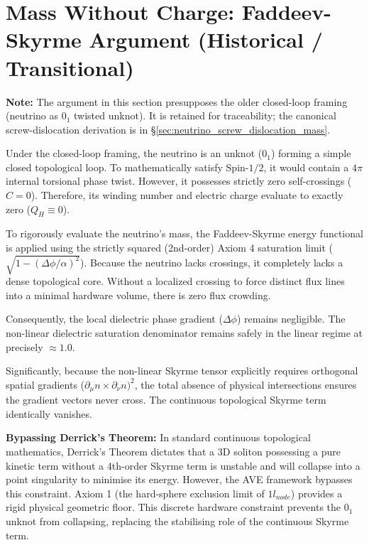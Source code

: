 \section{Mass Without Charge: Faddeev-Skyrme Argument (Historical / Transitional)}

\noindent\textbf{Note:} The argument in this section presupposes the older closed-loop framing (neutrino as $0_1$ twisted unknot). It is retained for traceability; the canonical screw-dislocation derivation is in \S\ref{sec:neutrino_screw_dislocation_mass}.

Under the closed-loop framing, the neutrino is an unknot ($0_{1}$) forming a simple closed topological loop. To
mathematically satisfy Spin-$1/2$, it would contain a $4\pi$ internal torsional phase twist. However, it
possesses strictly zero self-crossings ($C=0$). Therefore, its winding number and electric
charge evaluate to exactly zero ($Q_{H}\equiv0$).

To rigorously evaluate the neutrino's mass, the Faddeev-Skyrme energy functional is
applied using the strictly squared (2nd-order) Axiom 4 saturation limit ($\sqrt{1-(\Delta\phi/\alpha)^{2}}$). Because the
neutrino lacks crossings, it completely lacks a dense topological core. Without a localized
crossing to force distinct flux lines into a minimal hardware volume, there is zero flux crowding.

Consequently, the local dielectric phase gradient ($\Delta\phi$) remains negligible. The non-linear
dielectric saturation denominator remains safely in the linear regime at precisely $\approx1.0$.

Significantly, because the non-linear Skyrme tensor explicitly requires orthogonal spatial
gradients ($\partial_{\mu}n\times\partial_{\nu}n)^{2}$, the total absence of physical intersections ensures the gradient vectors never cross. The continuous topological Skyrme term identically vanishes. 

\textbf{Bypassing Derrick's Theorem:} In standard continuous topological mathematics, Derrick's Theorem dictates that a 3D soliton possessing a pure kinetic term without a 4th-order Skyrme term is unstable and will collapse into a point singularity to minimise its energy. However, the AVE framework bypasses this constraint. Axiom 1 (the hard-sphere exclusion limit of $1 l_{node}$) provides a rigid physical geometric floor. This discrete hardware constraint prevents the $0_1$ unknot from collapsing, replacing the stabilising role of the continuous Skyrme term.

